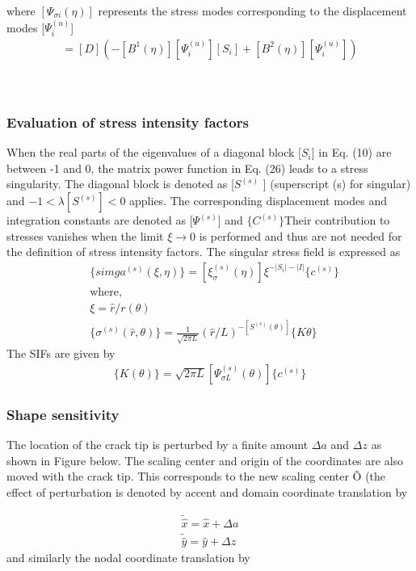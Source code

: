 \documentclass[12pt]{article}
\begin{document}
where $[\varPsi_{\sigma i}(\eta)]$ represents the stress modes corresponding to the displacement modes [$\varPsi_{i}^{(u)}$]
\begin{align*}
    [\varPsi_{\sigma i}(\eta)] = [D](-[B^1(\eta)][\varPsi_{i}^{(u)}][S_i]+[B^2(\eta)][\varPsi_i^{(u)}]) \tag{27}
\end{align*}
\\\\
\subsubsection{Evaluation of stress intensity factors}
When the real parts of the eigenvalues of a diagonal block [$S_i$] in Eq. (10) are between -1 and 0, the matrix power function
in Eq. (26) leads to a stress singularity. The diagonal block is denoted as [$S ^{(s)}$ ] (superscript (s) for singular) and
$-1 < \lambda[S^{(s)}] < 0$ applies. The corresponding displacement modes and integration constants are denoted as [$\varPsi^{(s)}$] and
$\{C^{(s)}\}$Their contribution to stresses
vanishes when the limit $\xi \rightarrow 0$ is performed and thus are not needed for the definition of stress intensity factors. The singular
stress field is expressed as
\begin{align*}
    &\{simga^{(s)}(\xi, \eta)\} = [\xi_{\sigma}^{(s)}(\eta)]\xi^{-|S_i| - |I|}\{c^{(s)}\}\\
    &\text{where,}\\
    &\xi = \hat{r}/r(\theta)\\
    &\{\sigma^{(s)}(\hat{r}, \theta)\} = \frac{1}{\sqrt{2\pi L}}(\hat{r}/L)^{-[S^{(s)}(\theta)]}\{K\theta\}
\end{align*}
The SIFs are given by
\begin{align*}
    \{K(\theta)\} = \sqrt{2 \pi L}[\varPsi_{\sigma L}^{(s)}(\theta)]\{c^{(s)}\}
\end{align*}
\subsubsection{Shape sensitivity}
The location of the crack tip is perturbed by a finite amount $\Delta a$ and $\Delta z$ as shown in Figure below. The scaling center and origin of
the coordinates are also moved with the crack tip. This corresponds to the new scaling center Õ (the effect of perturbation is
denoted by accent  and domain coordinate translation by


\begin{align*}
    \tilde{\hat{x}} = \hat{x} + \Delta a\\
    \tilde{\hat{y}} = \hat{y} + \Delta z
\end{align*}
and similarly the nodal coordinate translation by
\end{document}
